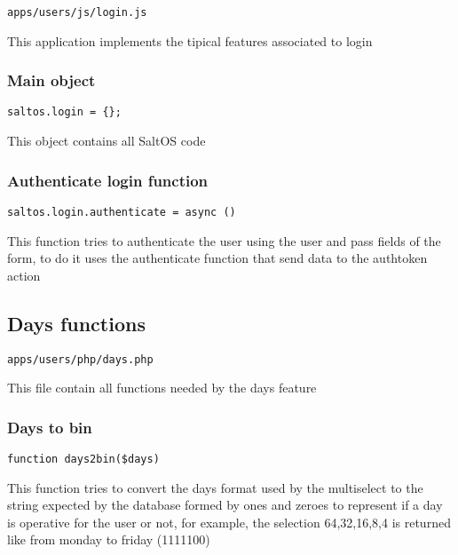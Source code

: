 \documentclass[a4paper]{article}
\begin{document}
\begin{lstlisting}
apps/users/js/login.js
\end{lstlisting}

This application implements the tipical features associated to login

\hypertarget{toc158}{}
\subsubsection{Main object}

\begin{lstlisting}
saltos.login = {};
\end{lstlisting}

This object contains all SaltOS code

\hypertarget{toc159}{}
\subsubsection{Authenticate login function}

\begin{lstlisting}
saltos.login.authenticate = async ()
\end{lstlisting}

This function tries to authenticate the user using the user and pass fields of the form, to do
it uses the authenticate function that send data to the authtoken action

\hypertarget{toc160}{}
\subsection{Days functions}

\begin{lstlisting}
apps/users/php/days.php
\end{lstlisting}

This file contain all functions needed by the days feature

\hypertarget{toc161}{}
\subsubsection{Days to bin}

\begin{lstlisting}
function days2bin($days)
\end{lstlisting}

This function tries to convert the days format used by the multiselect
to the string expected by the database formed by ones and zeroes to
represent if a day is operative for the user or not, for example, the
selection 64,32,16,8,4 is returned like from monday to friday (1111100)
\end{document}
